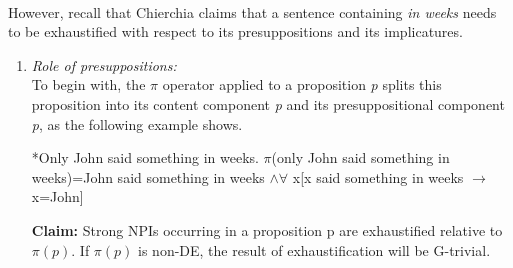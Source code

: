 \documentclass[a4paper,11pt]{article}
\begin{document}
\paragraph{}
However, recall that Chierchia claims that a sentence containing \textit{in weeks} needs to be exhaustified with respect to its presuppositions and its implicatures.
\begin{enumerate}
\item \textit{Role of presuppositions:} 
\\To begin with, the $\pi$ operator applied to a proposition \textit{p} splits this proposition into its content component \textit{\up{$\alpha$}p} and its presuppositional component \textit{\up{$\pi$}p}, as the following example shows.
\begin{exe}
\ex\label{pi} \begin{xlist}
\ex\label{pia} *Only John said something in weeks.
\ex\label{pib} $\pi$(only John said something in weeks)=John said something in weeks $\wedge\forall$ x[x said something in weeks $\rightarrow$ x=John] 
\end{xlist}
\end{exe}
\textbf{Claim:} Strong NPIs occurring in a proposition p are exhaustified relative to $\pi(p)$. If  $\pi(p)$ is non-DE, the result of exhaustification will be G-trivial.

\end{enumerate}
\end{document}
